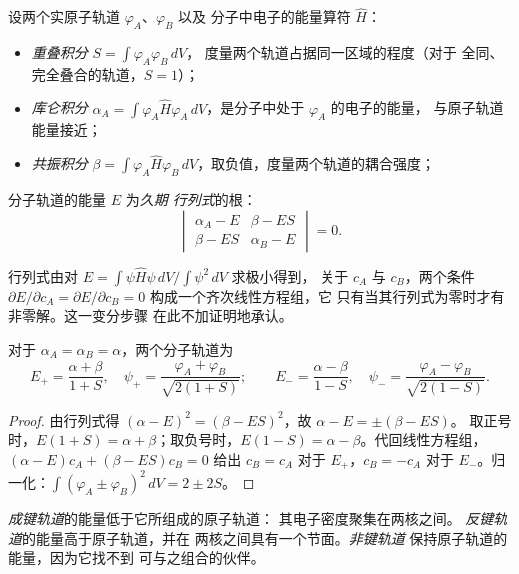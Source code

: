 \begin{definition}\label{def:b2:diatomic-mos:integrals}
设两个实原子轨道 $\varphi_A$、$\varphi_B$ 以及
分子中电子的能量算符 $\hat H$：
\begin{itemize}
  \item \emph{重叠积分} $S = \int\varphi_A\varphi_B\,dV$，
        度量两个轨道占据同一区域的程度（对于
        全同、完全叠合的轨道，$S = 1$）；
  \item \emph{库仑积分} $\alpha_A = \int\varphi_A\hat
        H\varphi_A\,dV$，是分子中处于 $\varphi_A$ 的电子的能量，
        与原子轨道能量接近；
  \item \emph{共振积分} $\beta = \int\varphi_A\hat
        H\varphi_B\,dV$，取负值，度量两个轨道的耦合强度；
\end{itemize}
分子轨道的能量 $E$ 为\emph{久期
行列式}的根：
\[
  \begin{vmatrix} \alpha_A - E & \beta - ES \\ \beta - ES & \alpha_B - E \end{vmatrix} = 0 .
\]
\end{definition}

行列式由对 $E = \int\psi\hat H\psi\,dV/\int\psi^2\,dV$ 求极小得到，
关于 $c_A$ 与 $c_B$，两个条件 $\partial E/\partial c_A =
\partial E/\partial c_B = 0$ 构成一个齐次线性方程组，它
只有当其行列式为零时才有非零解。这一变分步骤
在此不加证明地承认。

\begin{theorem}[两个全同轨道]\label{thm:b2:diatomic-mos:homonuclear}
对于 $\alpha_A = \alpha_B = \alpha$，两个分子轨道为
\[
  E_+ = \frac{\alpha + \beta}{1 + S}, \quad \psi_+ = \frac{\varphi_A + \varphi_B}{\sqrt{2(1 + S)}} ;
  \qquad
  E_- = \frac{\alpha - \beta}{1 - S}, \quad \psi_- = \frac{\varphi_A - \varphi_B}{\sqrt{2(1 - S)}} .
\]
\end{theorem}

\begin{proof}
由行列式得 $(\alpha - E)^2 = (\beta - ES)^2$，故 $\alpha - E = \pm(\beta - ES)$。
取正号时，$E(1 + S) = \alpha + \beta$；取负号时，$E(1 - S) = \alpha
- \beta$。代回线性方程组，$(\alpha - E)c_A + (\beta - ES)c_B = 0$ 给出 $c_B
= c_A$ 对于 $E_+$，$c_B = -c_A$ 对于 $E_-$。归一化：$\int(\varphi_A \pm
\varphi_B)^2\,dV = 2 \pm 2S$。
\end{proof}

\begin{definition}[成键轨道与反键轨道]\label{def:b2:diatomic-mos:bonding}
\emph{成键轨道}的能量低于它所组成的原子轨道：
其电子密度聚集在两核之间。
\emph{反键轨道}的能量高于原子轨道，并在
两核之间具有一个节面。\emph{非键轨道}
保持原子轨道的能量，因为它找不到
可与之组合的伙伴。
\end{definition}

